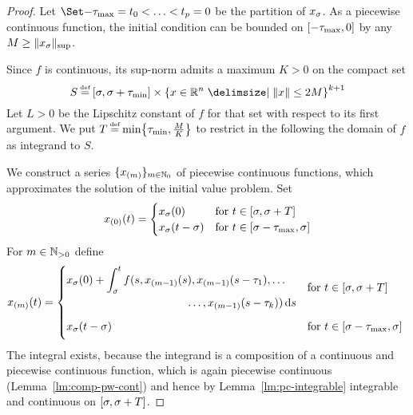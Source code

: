     \begin{proof}
        Let $\partition{-\taumax=t_0}{t_p=0}$ be the partition of $x_{\sigma}$. As a piecewise continuous function, the initial condition can be bounded on $[-\tau_{\max},0]$ by any $M\geq \lVert x_\sigma\rVert_{\sup}$.

        Since $f$ is continuous, its sup-norm admits a maximum $K>0$
        on the compact set
        \begin{equation*}
            S\defeq\compactum{\tzero}{\tzero+\taumin} \times \set{x\in\R^n\with \nnorm{x}\leq 2M}^{k+1}
        \end{equation*}
        Let $L>0$ be the Lipschitz constant of $f$ for that set with respect to its first argument.
        We put $T\defeq\min\set{\taumin,\frac{M}{K}}$ to restrict in the following the domain of $f$ as integrand to $S$.

        We construct a series $\{x_{(m)}\}_{m\in\mathbb{N}_0}$ of piecewise continuous functions, which approximates the solution of the initial value problem. Set
        \begin{equation*}
            x_{(0)}(t)= \begin{cases}
                x_\sigma(0) & \text{for } t\in[\sigma,\sigma+T]\\
                x_\sigma(t-\sigma) & \text{for } t\in[\sigma-\tau_{\max},\sigma]
            \end{cases}
        \end{equation*}
        For $m\in\mathbb{N}_{>0}$ define
        \begin{equation*}
            \seq{x}{m}(t)= \begin{dcases*}
                \begin{multlined}[c][0.57\displaywidth]
                    x_\tzero(0) + \integral{\tzero}{t}
                f(s,\seq{x}{m-1}(s),\seq{x}{m-1}(s-\tau_1),\ldots\\
                \ldots,\seq{x}{m-1}(s-\tau_k))\dx[s]
                \end{multlined} & for $t\in\compactum{\tzero}{\tzero+T}$\\
                x_\tzero(t-\tzero) \vphantom{\int} & for $t\in\compactum{\tzero-\taumax}{\tzero}$
            \end{dcases*}
        \end{equation*}
        The integral exists, because the integrand is a composition of a continuous and piecewise continuous function, which is again piecewise continuous (Lemma~\ref{lm:comp-pw-cont}) and hence by Lemma~\ref{lm:pc-integrable} integrable and continuous on $[\sigma,\sigma+T]$.


\end{proof}
